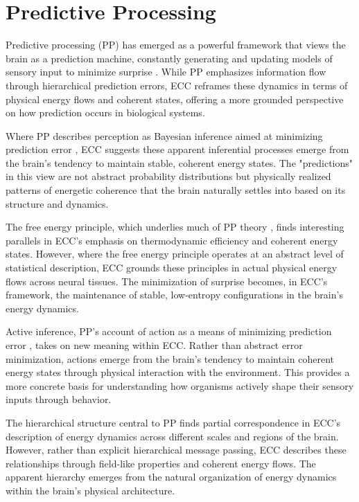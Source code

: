 \section{Predictive Processing}

Predictive processing (PP) has emerged as a powerful framework that views the brain as a prediction machine, constantly generating and updating models of sensory input to minimize surprise \cite{Clark2013}. While PP emphasizes information flow through hierarchical prediction errors, ECC reframes these dynamics in terms of physical energy flows and coherent states, offering a more grounded perspective on how prediction occurs in biological systems.

Where PP describes perception as Bayesian inference aimed at minimizing prediction error \cite{Friston2010}, ECC suggests these apparent inferential processes emerge from the brain's tendency to maintain stable, coherent energy states. The "predictions" in this view are not abstract probability distributions but physically realized patterns of energetic coherence that the brain naturally settles into based on its structure and dynamics.

The free energy principle, which underlies much of PP theory \cite{Friston2009}, finds interesting parallels in ECC's emphasis on thermodynamic efficiency and coherent energy states. However, where the free energy principle operates at an abstract level of statistical description, ECC grounds these principles in actual physical energy flows across neural tissues. The minimization of surprise becomes, in ECC's framework, the maintenance of stable, low-entropy configurations in the brain's energy dynamics.

Active inference, PP's account of action as a means of minimizing prediction error \cite{Clark2016}, takes on new meaning within ECC. Rather than abstract error minimization, actions emerge from the brain's tendency to maintain coherent energy states through physical interaction with the environment. This provides a more concrete basis for understanding how organisms actively shape their sensory inputs through behavior.

The hierarchical structure central to PP \cite{Hohwy2013} finds partial correspondence in ECC's description of energy dynamics across different scales and regions of the brain. However, rather than explicit hierarchical message passing, ECC describes these relationships through field-like properties and coherent energy flows. The apparent hierarchy emerges from the natural organization of energy dynamics within the brain's physical architecture.

